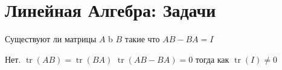 \section{Линейная Алгебра: Задачи}
\begin{problem}
	Существуют ли матрицы $A$ b $ B $ такие что $A B-B A=I$
\end{problem}

\begin{solution}
	Нет. $\operatorname{tr}(A B)=\operatorname{tr}(B A)$  $\operatorname{tr}(A B-B A)=0$ тогда как
	$\operatorname{tr}(I) \neq 0$
\end{solution}
		